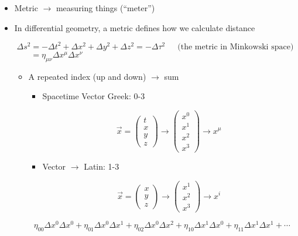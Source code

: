 \begin{itemize}

  \item Metric $\to$ measuring things (``meter'')

  \item In differential geometry, a metric defines how we calculate distance

    $$\Delta s^2=-\Delta t^2+\Delta x^2+\Delta y^2+\Delta z^2=-\Delta\tau^2\,\quad\text{ (the metric in Minkowski space)}$$
    $$=\eta_{\mu\nu}\Delta x^{\mu}\Delta x^{\nu}\quad\quad\quad\quad\quad\quad\quad\quad\quad\quad\quad\quad\quad\quad\quad\quad\quad\quad\quad\quad\quad\quad\quad\quad$$

    \begin{itemize}

      \item A repeated index (up and down) $\to$ sum

        \begin{itemize}

          \item Spacetime Vector \to Greek: 0-3

            $$\vec{x}=\left( \begin{array}{c} t\\x\\y\\z\end{array} \right)\to\left(\begin{array}{x} x^0\\ x^1\\ x^2\\ x^3\end{array}\right)\to x^{\mu}$$

          \item Vector $\to$ Latin: 1-3

            $$\vec{x}=\left( \begin{array}{c} x\\y\\z\end{array} \right)\to\left(\begin{array}{x} x^1\\ x^2\\ x^3\end{array}\right)\to x^{i}$$

        \end{itemize}

        $$\eta_{00}\Delta x^0\Delta x^0+\eta_{01}\Delta x^0\Delta x^1+\eta_{02}\Delta x^0\Delta x^2+\eta_{10}\Delta x^1\Delta x^0+\eta_{11}\Delta x^1\Delta x^1+\cdots$$


\end{itemize}
\end{itemize}
